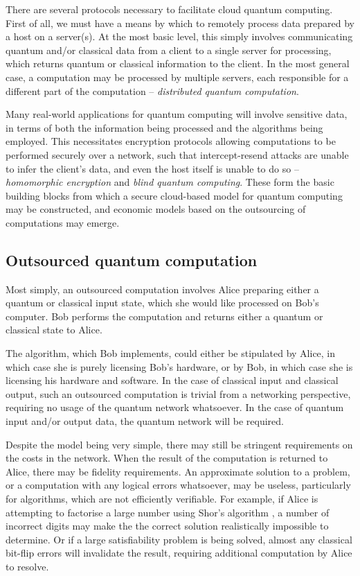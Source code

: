 \documentclass[aps,rmp,twocolumn,amsmath,amssymb,nofootinbib,superscriptaddress]{revtex4}
\begin{document}
There are several protocols necessary to facilitate cloud quantum computing. First of all, we must have a means by which to remotely process data prepared by a host on a server(s). At the most basic level, this simply involves communicating quantum and/or classical data from a client to a single server for processing, which returns quantum or classical information to the client. In the most general case, a computation may be processed by multiple servers, each responsible for a different part of the computation -- \emph{distributed quantum computation}.

Many real-world applications for quantum computing will involve sensitive data, in terms of both the information being processed and the algorithms being employed. This necessitates encryption protocols allowing computations to be performed securely over a network, such that intercept-resend attacks are unable to infer the client's data, and even the host itself is unable to do so -- \emph{homomorphic encryption} and \emph{blind quantum computing}. These form the basic building blocks from which a secure cloud-based model for quantum computing may be constructed, and economic models based on the outsourcing of computations may emerge.

%
%

\subsection{Outsourced quantum computation}

Most simply, an outsourced computation involves Alice preparing either a quantum or classical input state, which she would like processed on Bob's computer. Bob performs the computation and returns either a quantum or classical state to Alice.

The algorithm, which Bob implements, could either be stipulated by Alice, in which case she is purely licensing Bob's hardware, or by Bob, in which case she is licensing his hardware and software. In the case of classical input and classical output, such an outsourced computation is trivial from a networking perspective, requiring no usage of the quantum network whatsoever. In the case of quantum input and/or output data, the quantum network will be required.

Despite the model being very simple, there may still be stringent requirements on the costs in the network. When the result of the computation is returned to Alice, there may be fidelity requirements. An approximate solution to a problem, or a computation with any logical errors whatsoever, may be useless, particularly for algorithms, which are not efficiently verifiable. For example, if Alice is attempting to factorise a large number using Shor's algorithm \cite{bib:ShorFactor}, a number of incorrect digits may make the the correct solution realistically impossible to determine. Or if a large satisfiability problem is being solved, almost any classical bit-flip errors will invalidate the result, requiring additional computation by Alice to resolve.
\end{document}
